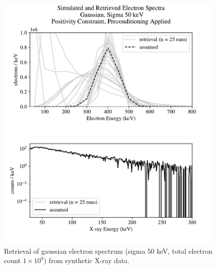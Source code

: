 \begin{figure}[p]
    \centering
    \includegraphics[width=\textwidth]{figures/chapter_4/synthetic_data_examples/gauss_50keV_posonly_preconditioning_1e8_particles}
    \caption{Retrieval of gaussian electron spectrum (sigma 50 keV, total electron count $1\times10^8$) from synthetic X-ray data.}
    \label{why_non_negative_is_good}
\end{figure}

